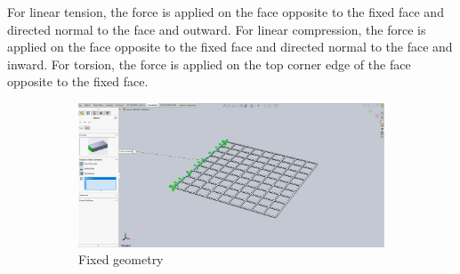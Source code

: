\documentclass[12pt, letterpaper]{article}
\begin{document}
For linear tension, the force is applied on the face opposite to the fixed face and directed normal to the face and outward. 
For linear compression, the force is applied on the face opposite to the fixed face and directed normal to the face and inward.
For torsion, the force is applied on the top corner edge of the face opposite to the fixed face. 

\begin{figure}[H]
	\centering
	\label{fig:procedure}
	\begin{subfigure}[t]{.8\linewidth}
		\includegraphics[width=\linewidth]{./procedure/fixed-geometry}
		\caption{Fixed geometry}
	\end{subfigure}
	\begin{subfigure}[t]{.3\linewidth}

\end{subfigure}
\end{figure}
\end{document}
